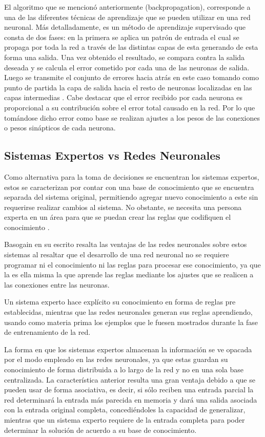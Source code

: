 	El algoritmo que se mencion\'{o} anteriormente (backpropagation), corresponde a
	una de las diferentes t\'{e}cnicas de aprendizaje que se pueden utilizar en una
	red neuronal. M\'{a}s detalladamente, es un m\'{e}todo de aprendizaje
	supervisado que consta de dos fases: en la primera se aplica un patr\'{o}n de entrada el cual se propaga por toda la red a trav\'{e}s de
las distintas capas de esta generando de esta forma una salida. Una vez obtenido
el resultado, se compara contra la salida deseada y se calcula el error cometido
por cada una de las neuronas de salida. Luego se transmite el conjunto de
errores hacia atr\'{a}s en este caso tomando como punto de partida la capa de
salida hacia el resto de neuronas localizadas en las capas intermedias
\cite{Fritsch1996}. Cabe destacar que el error recibido por cada neurona es
proporcional a su contribuci\'{o}n sobre el error total causado en la red. Por lo que tom\'{a}ndose dicho error como base se realizan ajustes a los pesos de las conexiones o pesos sin\'{a}pticos de cada neurona.

\subsection{Sistemas Expertos vs Redes Neuronales}
 
 		Como alternativa para la toma de decisiones se encuentran los sistemas
 	expertos, estos se caracterizan por contar con una base de conocimiento que
 	se encuentra separada del sistema original, permitiendo agregar nuevo
 	conocimiento a este sin requerirse realizar cambios al sistema. No obstante, se necesita una persona experta en un \'{a}rea para que se puedan crear las reglas que codifiquen el conocimiento \cite{Basogain}.
 	
 		Basogain en su escrito resalta las ventajas de las redes neuronales sobre
 	estos sistemas al resaltar que el desarrollo de una red neuronal no se
 	requiere programar ni el conocimiento ni las reglas para procesar ese
 	conocimiento, ya que la es ella misma la que aprende las reglas mediante los ajustes que se realicen a las conexiones entre las neuronas.
 		
 		Un sistema experto hace expl\'{i}cito su conocimiento en forma de reglas pre
 	establecidas, mientras que las redes neuronales generan sus reglas
 	aprendiendo, usando como materia prima los ejemplos que le fuesen mostrados
 	durante la fase de entrenamiento de la red.
 		
 			La forma en que los sistemas expertos almacenan la informaci\'{o}n se ve opacada
 	por el modo empleado en las redes neuronales, ya que estas guardan su
 	conocimiento de forma distribuida a lo largo de la red y no en una sola base
 	centralizada. La caracter\'{i}stica anterior resulta una gran ventaja debido a que se pueden usar de forma asociativa, es decir, si s\'{o}lo reciben una entrada parcial la red determinar\'{a} la entrada m\'{a}s parecida en memoria y dar\'{a} una salida asociada con la entrada original completa, concedi\'{e}ndoles la capacidad de generalizar, mientras que un sistema experto requiere de la entrada completa para poder determinar la soluci\'{o}n de acuerdo a su base de conocimiento.

